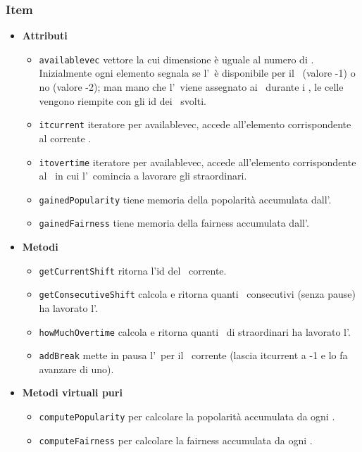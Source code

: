 \subsubsection{Item}
\begin{itemize}
    \item \textbf{Attributi}
    \begin{itemize}
        \item \texttt{available\textunderscore vec} vettore la cui dimensione è uguale al numero di \ttb. Inizialmente ogni elemento segnala se l'\items\ è disponibile per il \ttb\ (valore -1) o no (valore -2); man mano che l'\items\ viene assegnato ai \task\ durante i \ttb, le celle vengono riempite con gli id dei \task\ svolti.
        \item \texttt{it\textunderscore current} iteratore per available\textunderscore vec, accede all'elemento corrispondente al corrente \ttb.
        \item \texttt{it\textunderscore overtime} iteratore per available\textunderscore vec, accede all'elemento corrispondente al \ttb\ in cui l'\items\ comincia a lavorare gli straordinari.
        \item \texttt{gainedPopularity} tiene memoria della popolarità accumulata dall'\items.
        \item \texttt{gainedFairness} tiene memoria della fairness accumulata dall'\items.
    \end{itemize}
    \item \textbf{Metodi}
    \begin{itemize}
        \item \texttt{getCurrentShift} ritorna l'id del \ttb\ corrente.
        \item \texttt{getConsecutiveShift} calcola e ritorna quanti \ttb\ consecutivi (senza pause) ha lavorato l'\items.
        \item \texttt{howMuchOvertime} calcola e ritorna quanti \ttb\ di straordinari ha lavorato l'\items.
        \item \texttt{addBreak} mette in pausa l'\items\ per il \ttb\ corrente (lascia it\textunderscore current a -1 e lo fa avanzare di uno).
    \end{itemize}
\item \textbf{Metodi virtuali puri}
    \begin{itemize}
        \item \texttt{computePopularity} per calcolare la popolarità accumulata da ogni \items.
        \item \texttt{computeFairness} per calcolare la fairness accumulata da ogni \items.

\end{itemize}
\end{itemize}
